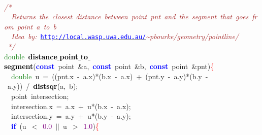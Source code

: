 {{\mbox{} \\
\mbox{}\textit{\textcolor{Brown}{/*}} \\
\mbox{}\textit{\textcolor{Brown}{\ \ Returns\ the\ closest\ distance\ between\ point\ pnt\ and\ the\ segment\ that\ goes\ from\ point\ a\ to\ b}} \\
\mbox{}\textit{\textcolor{Brown}{\ \ Idea\ by:\ }}\underline{\texttt{\textcolor{Blue}{http://local.wasp.uwa.edu.au/}}}\textit{\textcolor{Brown}{\textasciitilde{}pbourke/geometry/pointline/}} \\
\mbox{}\textit{\textcolor{Brown}{\ */}} \\
\mbox{}\textcolor{ForestGreen}{double}\ \textbf{\textcolor{Black}{distance$\_$point$\_$to$\_$segment}}\textcolor{BrickRed}{(}\textbf{\textcolor{Blue}{const}}\ point\ \textcolor{BrickRed}{\&}a\textcolor{BrickRed}{,}\ \textbf{\textcolor{Blue}{const}}\ point\ \textcolor{BrickRed}{\&}b\textcolor{BrickRed}{,}\ \textbf{\textcolor{Blue}{const}}\ point\ \textcolor{BrickRed}{\&}pnt\textcolor{BrickRed}{)}\textcolor{Red}{\{} \\
\mbox{}\ \ \textcolor{ForestGreen}{double}\ u\ \textcolor{BrickRed}{=}\ \textcolor{BrickRed}{((}pnt\textcolor{BrickRed}{.}x\ \textcolor{BrickRed}{-}\ a\textcolor{BrickRed}{.}x\textcolor{BrickRed}{)*(}b\textcolor{BrickRed}{.}x\ \textcolor{BrickRed}{-}\ a\textcolor{BrickRed}{.}x\textcolor{BrickRed}{)}\ \textcolor{BrickRed}{+}\ \textcolor{BrickRed}{(}pnt\textcolor{BrickRed}{.}y\ \textcolor{BrickRed}{-}\ a\textcolor{BrickRed}{.}y\textcolor{BrickRed}{)*(}b\textcolor{BrickRed}{.}y\ \textcolor{BrickRed}{-}\ a\textcolor{BrickRed}{.}y\textcolor{BrickRed}{))}\ \textcolor{BrickRed}{/}\ \textbf{\textcolor{Black}{distsqr}}\textcolor{BrickRed}{(}a\textcolor{BrickRed}{,}\ b\textcolor{BrickRed}{);} \\
\mbox{}\ \ point\ intersection\textcolor{BrickRed}{;} \\
\mbox{}\ \ intersection\textcolor{BrickRed}{.}x\ \textcolor{BrickRed}{=}\ a\textcolor{BrickRed}{.}x\ \textcolor{BrickRed}{+}\ u\textcolor{BrickRed}{*(}b\textcolor{BrickRed}{.}x\ \textcolor{BrickRed}{-}\ a\textcolor{BrickRed}{.}x\textcolor{BrickRed}{);} \\
\mbox{}\ \ intersection\textcolor{BrickRed}{.}y\ \textcolor{BrickRed}{=}\ a\textcolor{BrickRed}{.}y\ \textcolor{BrickRed}{+}\ u\textcolor{BrickRed}{*(}b\textcolor{BrickRed}{.}y\ \textcolor{BrickRed}{-}\ a\textcolor{BrickRed}{.}y\textcolor{BrickRed}{);} \\
\mbox{}\ \ \textbf{\textcolor{Blue}{if}}\ \textcolor{BrickRed}{(}u\ \textcolor{BrickRed}{$<$}\ \textcolor{Purple}{0.0}\ \textcolor{BrickRed}{$|$$|$}\ u\ \textcolor{BrickRed}{$>$}\ \textcolor{Purple}{1.0}\textcolor{BrickRed}{)}\textcolor{Red}{\{} \\
}}
